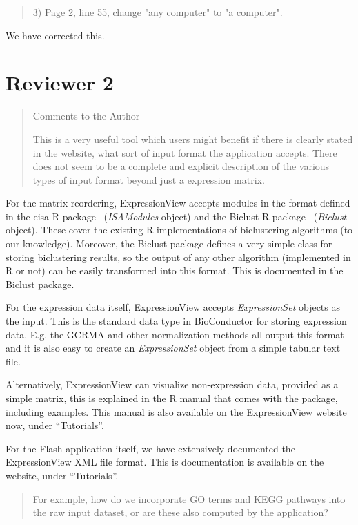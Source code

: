 \documentclass[a4paper]{article}
\newenvironment{myquote}{\begin{quote}\color{blue}}{\end{quote}}
\begin{document}
\begin{myquote}
3) Page 2, line 55, change "any computer" to "a computer".
\end{myquote}

We have corrected this.

\section*{Reviewer 2}

\begin{myquote}
Comments to the Author

This is a very useful tool which users might  benefit if there is
clearly stated in the website, what sort of input format the
application accepts. There does not seem to be a complete and explicit
description of the various types of input format beyond just a
expression matrix.
\end{myquote}

For the matrix reordering, ExpressionView accepts modules in the
format defined in the eisa R package~\citep{csardi10}
(\textit{ISAModules} object) and the
Biclust R package~\citep{kaiser08} (\textit{Biclust} object). These
cover the existing R implementations of biclustering algorithms (to our
knowledge). Moreover, the Biclust package defines a very simple class
for storing biclustering results, so the output of any other algorithm
(implemented in R or not) can be easily transformed into this
format. This is documented in the Biclust package.

For the expression data itself, ExpressionView accepts
\textit{ExpressionSet} objects as the input. This is the standard data
type in BioConductor for storing expression data. E.g. the GCRMA and
other normalization methods all output this format and it is also easy
to create an \textit{ExpressionSet} object from a simple tabular text
file.

Alternatively, ExpressionView can visualize non-expression data,
provided as a simple matrix, this is explained in the R manual that
comes with the package, including examples. This manual is also
available on the ExpressionView website now, under ``Tutorials''.

For the Flash application itself, we have extensively documented the
ExpressionView XML file format. This is documentation is available on
the website, under ``Tutorials''.

\begin{myquote}
For example, how do we incorporate GO terms and
KEGG pathways into the raw input dataset, or are these also computed
by the application? 
\end{myquote}
\end{document}
